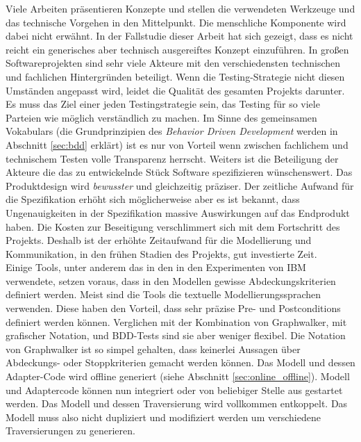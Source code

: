 Viele Arbeiten\cite{pretschner_one_2005}\cite{pinheiro_model-based_2013}\cite{sensler_testautomatisierung_2011} präsentieren Konzepte und stellen die verwendeten Werkzeuge und das technische Vorgehen in den Mittelpunkt. Die menschliche Komponente wird dabei nicht erwähnt. In der Fallstudie dieser Arbeit hat sich gezeigt, dass es nicht reicht ein generisches aber technisch ausgereiftes Konzept einzuführen. In großen Softwareprojekten sind sehr viele Akteure mit den verschiedensten technischen und fachlichen Hintergründen beteiligt. Wenn die Testing-Strategie nicht diesen Umständen angepasst wird, leidet die Qualität des gesamten Projekts darunter. Es muss das Ziel einer jeden Testingstrategie sein, das Testing für so viele Parteien wie möglich verständlich zu machen. Im Sinne des gemeinsamen Vokabulars (die Grundprinzipien des \textit{Behavior Driven Development} werden in Abschnitt \ref{sec:bdd} erklärt) ist es nur von Vorteil wenn zwischen fachlichem und technischem Testen volle Transparenz herrscht. Weiters ist die Beteiligung der Akteure die das zu entwickelnde Stück Software spezifizieren wünschenswert. Das Produktdesign wird \textit{bewusster} und gleichzeitig präziser. Der zeitliche Aufwand für die Spezifikation erhöht sich möglicherweise aber es ist bekannt, dass Ungenauigkeiten in der Spezifikation massive Auswirkungen auf das Endprodukt haben. Die Kosten zur Beseitigung verschlimmert sich mit dem Fortschritt des Projekts. Deshalb ist der erhöhte Zeitaufwand für die Modellierung und Kommunikation, in den frühen Stadien des Projekts, gut investierte Zeit.\\
Einige Tools, unter anderem das in den in den Experimenten von IBM\cite{farchi_using_2002} verwendete, setzen voraus, dass in den Modellen gewisse Abdeckungskriterien definiert werden. Meist sind die Tools die textuelle Modellierungssprachen verwenden. Diese haben den Vorteil, dass sehr präzise Pre- und Postconditions definiert werden können. Verglichen mit der Kombination von Graphwalker, mit grafischer Notation, und BDD-Tests sind sie aber weniger flexibel. Die Notation von Graphwalker ist so simpel gehalten, dass keinerlei Aussagen über Abdeckungs- oder Stoppkriterien gemacht werden können. Das Modell und dessen Adapter-Code wird offline generiert (siehe Abschnitt  \ref{sec:online_offline}). Modell und Adaptercode können nun integriert oder von beliebiger Stelle aus gestartet werden. Das Modell und dessen Traversierung wird vollkommen entkoppelt. Das Modell muss also nicht dupliziert und modifiziert werden um verschiedene Traversierungen zu generieren.\\

